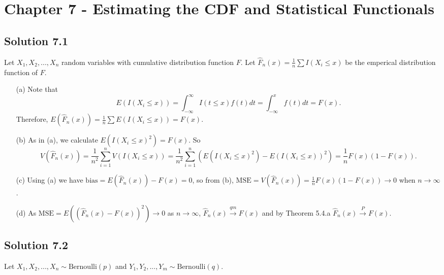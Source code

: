 \section*{Chapter 7 - Estimating the CDF and Statistical Functionals}

\subsection*{Solution 7.1}

Let $X_1, X_2, ..., X_n$ random variables with cumulative distribution function $F$.
Let $\hat{F}_n(x) = \frac{1}{n} \sum I(X_i \leq x)$ be the emperical distribution function of $F$.
\begin{itemize}
    \item[(a)] Note that
        \begin{equation*}
            E(I(X_i \leq x)) = \int_{-\infty}^{\infty} I(t \leq x) f(t) dt
                = \int_{-\infty}^{x} f(t) dt
                = F(x).
        \end{equation*}
        Therefore, $E(\hat{F}_n(x)) = \frac{1}{n} \sum E(I(X_i \leq x)) = F(x)$.
    \item[(b)] As in (a), we calculate $E(I(X_i \leq x)^2) = F(x)$.
        So
        \begin{equation*}
            V(\hat{F}_n(x)) = \frac{1}{n^2} \sum_{i = 1}^n V(I(X_i \leq x))
                = \frac{1}{n^2} \sum_{i = 1}^n (E(I(X_i \leq x)^2) - E(I(X_i \leq x))^2)
                = \frac{1}{n} F(x) (1 - F(x)).
        \end{equation*}
    \item[(c)] Using (a) we have $\mathrm{bias} = E(\hat{F}_n(x)) - F(x) = 0$, so from (b), $\mathrm{MSE} = V(\hat{F}_n(x)) = \frac{1}{n} F(x) (1 - F(x)) \to 0$ when $n \to \infty$.
    \item[(d)] As $\mathrm{MSE} = E((\hat{F}_n(x) - F(x))^2) \to 0$ as $n \to \infty$, $\hat{F}_n(x) \xrightarrow{qm} F(x)$ and by Theorem 5.4.a $\hat{F}_n(x) \xrightarrow{P} F(x)$.
\end{itemize}


\subsection*{Solution 7.2}

Let $X_1, X_2, ..., X_n \sim \mathrm{Bernoulli}(p)$ and $Y_1, Y_2, ..., Y_m \sim \mathrm{Bernoulli}(q)$.


